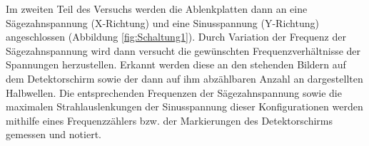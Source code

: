 Im zweiten Teil des Versuchs werden die Ablenkplatten dann an eine Sägezahnspannung (X-Richtung)
und eine Sinusspannung (Y-Richtung) angeschlossen (Abbildung \ref{fig:Schaltung1}). Durch Variation
der Frequenz der Sägezahnspannung wird dann versucht die gewünschten Frequenzverhältnisse
der Spannungen herzustellen. Erkannt werden diese an den stehenden Bildern auf dem
Detektorschirm sowie der dann auf ihm abzählbaren Anzahl an dargestellten Halbwellen.
Die entsprechenden Frequenzen der Sägezahnspannung sowie die maximalen Strahlauslenkungen der Sinusspannung
dieser Konfigurationen werden mithilfe eines Frequenzzählers bzw. der Markierungen des Detektorschirms
gemessen und notiert.

